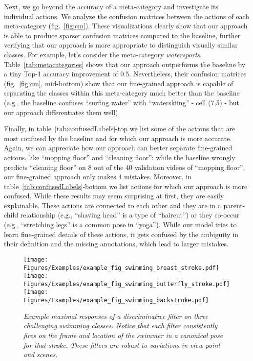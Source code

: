 \documentclass[10pt,twocolumn,letterpaper]{article}
\begin{document}
Next, we go beyond the accuracy of a meta-category and investigate its individual actions. We analyze the confusion matrices between the actions of each meta-category (fig.~\ref{fig:cm}). These visualizations clearly show that our approach is able to produce sparser confusion matrices compared to the baseline, further verifying that our approach is more appropriate to distinguish visually similar classes. For example, let's consider the meta-category {\it watersports}. Table~\ref{tab:metacategories} shows that our approach outperforms the baseline by a tiny Top-1 accuracy improvement of 0.5. Nevertheless, their confusion matrices (fig.~\ref{fig:cm}, mid-bottom) show that our fine-grained approach is capable of separating the classes within this meta-category much better than the baseline (e.g., the baseline confuses ``surfing water'' with ``waterskiing'' - cell (7,5) - but our approach differentiates them well).  

Finally, in table~\ref{tab:confusedLabels}-top we list some of the actions that are most confused by the baseline and for which our approach is more accurate. Again, we can appreciate how our approach can better separate fine-grained actions, like ``mopping floor'' and ``cleaning floor'': while the baseline wrongly predicts ``cleaning floor'' on 8 out of the 40 validation videos of ``mopping floor'', our fine-grained approach only makes 4 mistakes. Moreover, in table~\ref{tab:confusedLabels}-bottom we list actions for which our approach is more confused. While these results may seem surprising at first, they are easily explainable. These actions are connected to each other and they are in a parent-child relationship (e.g., ``shaving head'' is a type of ``haircut'') or they co-occur (e.g., ``stretching legs'' is a common pose in ``yoga''). While our model tries to learn fine-grained details of these actions, it gets confused by the ambiguity in their definition and the missing annotations, which lead to larger mistakes.

\begin{figure}
    \begin{center}
    \vspace{-3mm}
    \texttt{[image: Figures/Examples/example\_fig\_swimming\_breast\_stroke.pdf]}
    \texttt{[image: Figures/Examples/example\_fig\_swimming\_butterfly\_stroke.pdf]}
    \texttt{[image: Figures/Examples/example\_fig\_swimming\_backstroke.pdf]}
    \end{center}
    \vspace{-6mm}
    \caption{\it Example maximal responses of a discriminative filter on three challenging swimming classes. Notice that each filter consistently fires on the frame and location of the swimmer in a canonical pose for that stroke. These filters are robust to variations in view-point and scenes. \vspace{-4mm}}
    \label{fig:qual_swimming}
\end{figure}
\end{document}
